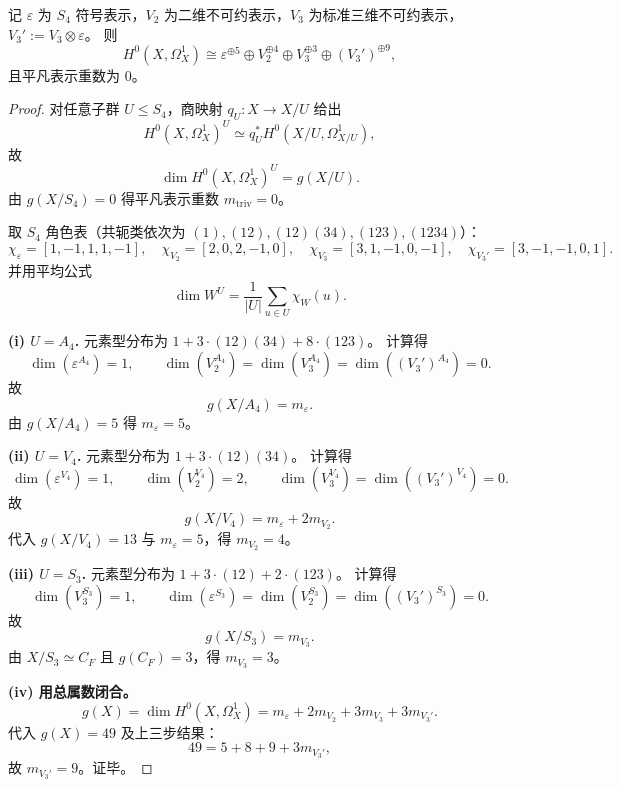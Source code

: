 \begin{theorem}\label{thm:conclusion-cf-s4-holomorphic-differential-decomposition}
记 \(\varepsilon\) 为 \(S_4\) 符号表示，\(V_2\) 为二维不可约表示，\(V_3\) 为标准三维不可约表示，\(V_3':=V_3\otimes\varepsilon\)。
则
\[
H^0(X,\Omega_X^1)
\cong
\varepsilon^{\oplus 5}\oplus V_2^{\oplus 4}\oplus V_3^{\oplus 3}\oplus (V_3')^{\oplus 9},
\]
且平凡表示重数为 \(0\)。
\end{theorem}
\begin{proof}
对任意子群 \(U\le S_4\)，商映射 \(q_U:X\to X/U\) 给出
\[
H^0(X,\Omega_X^1)^U\simeq q_U^*H^0(X/U,\Omega_{X/U}^1),
\]
故
\[
\dim H^0(X,\Omega_X^1)^U=g(X/U).
\]
由 \(g(X/S_4)=0\) 得平凡表示重数 \(m_{\mathrm{triv}}=0\)。

取 \(S_4\) 角色表（共轭类依次为
\((1),(12),(12)(34),(123),(1234)\)）：
\[
\chi_{\varepsilon}=[1,-1,1,1,-1],\quad
\chi_{V_2}=[2,0,2,-1,0],\quad
\chi_{V_3}=[3,1,-1,0,-1],\quad
\chi_{V_3'}=[3,-1,-1,0,1].
\]
并用平均公式
\[
\dim W^U=\frac{1}{|U|}\sum_{u\in U}\chi_W(u).
\]

\textbf{(i) \(U=A_4\).}
元素型分布为 \(1+3\cdot(12)(34)+8\cdot(123)\)。
计算得
\[
\dim(\varepsilon^{A_4})=1,\qquad
\dim(V_2^{A_4})=\dim(V_3^{A_4})=\dim((V_3')^{A_4})=0.
\]
故
\[
g(X/A_4)=m_{\varepsilon}.
\]
由 \(g(X/A_4)=5\) 得 \(m_{\varepsilon}=5\)。

\textbf{(ii) \(U=V_4\).}
元素型分布为 \(1+3\cdot(12)(34)\)。
计算得
\[
\dim(\varepsilon^{V_4})=1,\qquad
\dim(V_2^{V_4})=2,\qquad
\dim(V_3^{V_4})=\dim((V_3')^{V_4})=0.
\]
故
\[
g(X/V_4)=m_{\varepsilon}+2m_{V_2}.
\]
代入 \(g(X/V_4)=13\) 与 \(m_{\varepsilon}=5\)，得 \(m_{V_2}=4\)。

\textbf{(iii) \(U=S_3\).}
元素型分布为 \(1+3\cdot(12)+2\cdot(123)\)。
计算得
\[
\dim(V_3^{S_3})=1,\qquad
\dim(\varepsilon^{S_3})=\dim(V_2^{S_3})=\dim((V_3')^{S_3})=0.
\]
故
\[
g(X/S_3)=m_{V_3}.
\]
由 \(X/S_3\simeq C_F\) 且 \(g(C_F)=3\)，得 \(m_{V_3}=3\)。

\textbf{(iv) 用总属数闭合。}
\[
g(X)=\dim H^0(X,\Omega_X^1)
=m_{\varepsilon}+2m_{V_2}+3m_{V_3}+3m_{V_3'}.
\]
代入 \(g(X)=49\) 及上三步结果：
\[
49=5+8+9+3m_{V_3'},
\]
故 \(m_{V_3'}=9\)。证毕。
\end{proof}

